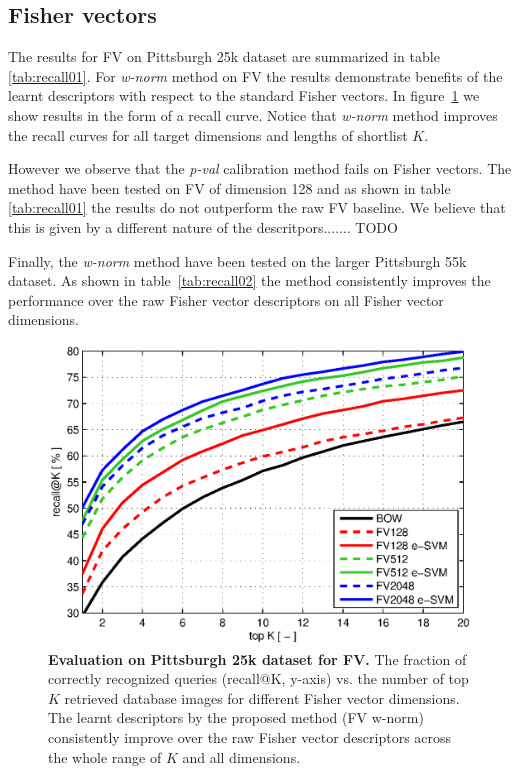   \subsection{Fisher vectors}
  The results for FV on Pittsburgh 25k dataset are summarized in table \ref{tab:recall01}. For \emph{w-norm} method on FV the results demonstrate benefits of the learnt descriptors with respect to the standard Fisher vectors. In figure~\ref{fig:recall} we show results in the form of a recall curve. Notice that \emph{w-norm} method improves the recall curves for all target dimensions and lengths of shortlist $K$.

  

  However we observe that the \emph{p-val} calibration method fails on Fisher vectors. The method have been tested on FV of dimension 128 and as shown in table \ref{tab:recall01} the results do not outperform the raw FV baseline. We believe that this is given by a different nature of the descritpors....... TODO

  Finally, the \emph{w-norm} method have been tested on the larger Pittsburgh 55k dataset. As shown in table~\ref{tab:recall02} the method consistently improves the performance over the raw Fisher vector descriptors on all Fisher vector dimensions. 
    \begin{figure}[t!]
        \centering
        \includegraphics[width=1.1\linewidth]{imgs/plotPitt25k}  
        \caption{
            \textbf{Evaluation on Pittsburgh 25k \cite{Gronat13} dataset for FV.} The fraction of correctly recognized queries (recall@K, y-axis) vs. the number of top $K$ retrieved database images for different Fisher vector dimensions. The learnt descriptors by the proposed method (FV w-norm) consistently improve over the raw Fisher vector descriptors across the whole range of $K$ and all dimensions.
        }
        \label{fig:recall}
    \end{figure}

